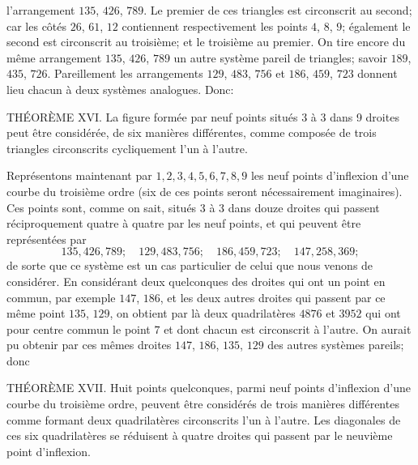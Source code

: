 \documentclass[11pt]{article}
\begin{document}
\vfill\pagebreak

l'arrangement $135$, $426$, $789$. Le premier de ces triangles est circonscrit au second; car
les c\^ot\'es $26$, $61$, $12$ contiennent respectivement les points $4$, $8$, $9$; \'egalement le second
est circonscrit au troisi\`eme; et le troisi\`eme au premier. On tire encore du m\^eme
arrangement $135$, $426$, $789$ un autre syst\`eme pareil de triangles; savoir $189$, $435$, $726$.
Pareillement les arrangements $129$, $483$, $756$ et $186$, $459$, $723$ donnent lieu chacun \`a
deux syst\`emes analogues. Donc:

\medskip

TH\'EOR\`EME XVI. La figure form\'ee par neuf points situ\'es 3 \`a 3 dans 9 droites
peut \^etre consid\'er\'ee, de six mani\`eres diff\'erentes, comme compos\'ee de trois triangles
circonscrits cycliquement l'un \`a l'autre.

\medskip

Repr\'esentons maintenant par $1, 2, 3, 4, 5, 6, 7, 8, 9$ les neuf points d'inflexion
d'une courbe du troisi\`eme ordre (six de ces points seront n\'ecessairement imaginaires).
Ces points sont, comme on sait, situ\'es 3 \`a 3 dans douze droites qui passent r\'eciproquement
quatre \`a quatre par les neuf points, et qui peuvent \^etre repr\'esent\'ees par
\[
135, 426, 789;\quad 129, 483, 756;\quad 186, 459, 723;\quad 147, 258, 369;
\]
de sorte que ce syst\`eme est un cas particulier de celui que nous venons de consid\'erer.
En consid\'erant deux quelconques des droites qui ont un point en commun, par exemple
$147$, $186$, et les deux autres droites qui passent par ce m\^eme point $135$, $129$, on obtient
par l\`a deux quadrilat\`eres $4876$ et $3952$ qui ont pour centre commun le point $7$ et
dont chacun est circonscrit \`a l'autre. On aurait pu obtenir par ces m\^emes droites
$147$, $186$, $135$, $129$ des autres syst\`emes pareils; donc

\medskip

TH\'EOR\`EME XVII. Huit points quelconques, parmi neuf points d'inflexion d'une
courbe du troisi\`eme ordre, peuvent \^etre consid\'er\'es de trois mani\`eres diff\'erentes comme
formant deux quadrilat\`eres circonscrits l'un \`a l'autre. Les diagonales de ces six
quadrilat\`eres se r\'eduisent \`a quatre droites qui passent par le neuvi\`eme point d'inflexion.
\end{document}
